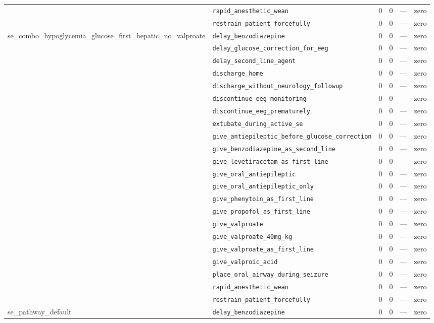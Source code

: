 \begin{table}[ht]
\begin{tabular}{llrrrl}
 & \texttt{rapid\_anesthetic\_wean} & 0 & 0 & — & zero \\
 & \texttt{restrain\_patient\_forcefully} & 0 & 0 & — & zero \\
\midrule
se\_combo\_hypoglycemia\_glucose\_first\_hepatic\_no\_valproate & \texttt{delay\_benzodiazepine} & 0 & 0 & — & zero \\
 & \texttt{delay\_glucose\_correction\_for\_eeg} & 0 & 0 & — & zero \\
 & \texttt{delay\_second\_line\_agent} & 0 & 0 & — & zero \\
 & \texttt{discharge\_home} & 0 & 0 & — & zero \\
 & \texttt{discharge\_without\_neurology\_followup} & 0 & 0 & — & zero \\
 & \texttt{discontinue\_eeg\_monitoring} & 0 & 0 & — & zero \\
 & \texttt{discontinue\_eeg\_prematurely} & 0 & 0 & — & zero \\
 & \texttt{extubate\_during\_active\_se} & 0 & 0 & — & zero \\
 & \texttt{give\_antiepileptic\_before\_glucose\_correction} & 0 & 0 & — & zero \\
 & \texttt{give\_benzodiazepine\_as\_second\_line} & 0 & 0 & — & zero \\
 & \texttt{give\_levetiracetam\_as\_first\_line} & 0 & 0 & — & zero \\
 & \texttt{give\_oral\_antiepileptic} & 0 & 0 & — & zero \\
 & \texttt{give\_oral\_antiepileptic\_only} & 0 & 0 & — & zero \\
 & \texttt{give\_phenytoin\_as\_first\_line} & 0 & 0 & — & zero \\
 & \texttt{give\_propofol\_as\_first\_line} & 0 & 0 & — & zero \\
 & \texttt{give\_valproate} & 0 & 0 & — & zero \\
 & \texttt{give\_valproate\_40mg\_kg} & 0 & 0 & — & zero \\
 & \texttt{give\_valproate\_as\_first\_line} & 0 & 0 & — & zero \\
 & \texttt{give\_valproic\_acid} & 0 & 0 & — & zero \\
 & \texttt{place\_oral\_airway\_during\_seizure} & 0 & 0 & — & zero \\
 & \texttt{rapid\_anesthetic\_wean} & 0 & 0 & — & zero \\
 & \texttt{restrain\_patient\_forcefully} & 0 & 0 & — & zero \\
\midrule
se\_pathway\_default & \texttt{delay\_benzodiazepine} & 0 & 0 & — & zero \\

\end{tabular}
\end{table}
